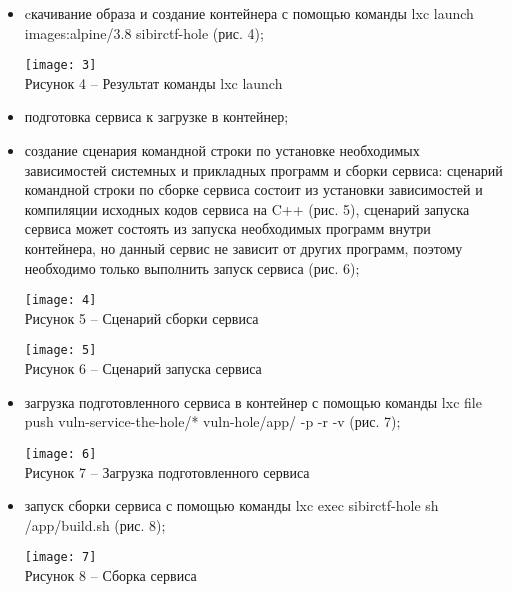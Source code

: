 \begin{itemize}
\item cкачивание образа и создание контейнера с помощью команды lxc launch images:alpine/3.8 sibirctf-hole (рис. 4);
\begin{center}
\texttt{[image: 3]}\\
Рисунок 4 -- Результат команды lxc launch\\
\end{center}
\vspace{\baselineskip}

\item подготовка сервиса к загрузке в контейнер;
\item создание сценария командной строки по установке необходимых зависимостей системных и прикладных программ и сборки сервиса: сценарий командной строки по сборке сервиса состоит из установки зависимостей и компиляции исходных кодов сервиса на C++ (рис. 5), сценарий запуска сервиса может состоять из запуска необходимых программ внутри контейнера, но данный сервис не зависит от других программ, поэтому необходимо только выполнить запуск сервиса (рис. 6);
\begin{center}
\texttt{[image: 4]}\\
Рисунок 5 -- Сценарий сборки сервиса\\
\end{center}
\vspace{\baselineskip}

\begin{center}
\texttt{[image: 5]}\\
Рисунок 6 -- Сценарий запуска сервиса\\
\end{center}
\vspace{\baselineskip}

\item загрузка подготовленного сервиса в контейнер с помощью команды lxc file push vuln-service-the-hole/* vuln-hole/app/ -p -r -v (рис. 7);
\begin{center}
\texttt{[image: 6]}\\
Рисунок 7 -- Загрузка подготовленного сервиса\\
\end{center}
\vspace{\baselineskip}

\item запуск сборки сервиса с помощью команды lxc exec sibirctf-hole sh /app/build.sh (рис. 8);
\begin{center}
\texttt{[image: 7]}\\
Рисунок 8 -- Сборка сервиса\\
\end{center}
\vspace{\baselineskip}


\end{itemize}

